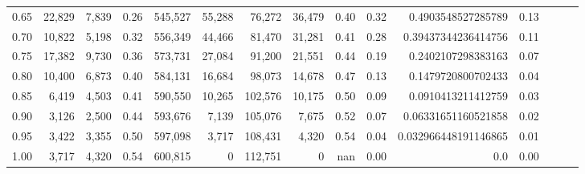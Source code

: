 \begin{tabular}{rrrrrrrrrrrrrrr}
0.65 &  22,829 &   7,839 &  0.26 &  545,527 &   55,288 &   76,272 &   36,479 &  0.40 &  0.32 &    0.4903548527285789 &      0.13 \\
0.70 &  10,822 &   5,198 &  0.32 &  556,349 &   44,466 &   81,470 &   31,281 &  0.41 &  0.28 &   0.39437344236414756 &      0.11 \\
0.75 &  17,382 &   9,730 &  0.36 &  573,731 &   27,084 &   91,200 &   21,551 &  0.44 &  0.19 &    0.2402107298383163 &      0.07 \\
0.80 &  10,400 &   6,873 &  0.40 &  584,131 &   16,684 &   98,073 &   14,678 &  0.47 &  0.13 &    0.1479720800702433 &      0.04 \\
0.85 &   6,419 &   4,503 &  0.41 &  590,550 &   10,265 &  102,576 &   10,175 &  0.50 &  0.09 &    0.0910413211412759 &      0.03 \\
0.90 &   3,126 &   2,500 &  0.44 &  593,676 &    7,139 &  105,076 &    7,675 &  0.52 &  0.07 &   0.06331651160521858 &      0.02 \\
0.95 &   3,422 &   3,355 &  0.50 &  597,098 &    3,717 &  108,431 &    4,320 &  0.54 &  0.04 &  0.032966448191146865 &      0.01 \\
1.00 &   3,717 &   4,320 &  0.54 &  600,815 &        0 &  112,751 &        0 &   nan &  0.00 &                   0.0 &      0.00 \\
\bottomrule
\end{tabular}
